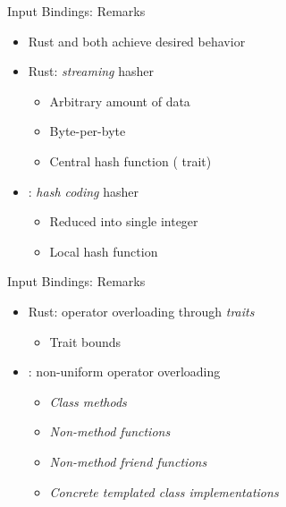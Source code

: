 \begin{frame}[t]{Input Bindings: Remarks}

    \begin{itemize}
        \itemsep.3em

        \item Rust and \cpp both achieve desired behavior

        \item Rust: \textit{streaming} hasher
            \begin{itemize}
                \item Arbitrary amount of data
                \item Byte-per-byte
                \item Central hash function ( trait)
            \end{itemize}

        \item \cpp: \textit{hash coding} hasher
            \begin{itemize}
                \item Reduced into single integer
                \item Local hash function
            \end{itemize}

    \end{itemize}

    \vfill

\end{frame}

\begin{frame}[t]{Input Bindings: Remarks}

    \begin{itemize}
        \itemsep.3em

        \item Rust: operator overloading through \textit{traits}
            \begin{itemize}
                \item Trait bounds
            \end{itemize}

        \item \cpp: non-uniform operator overloading
            \begin{itemize}
                \item \textit{Class methods}
                \item \textit{Non-method functions}
                \item \textit{Non-method friend functions}
                \item \textit{Concrete templated class implementations}
            \end{itemize}

    \end{itemize}

    \vfill

\end{frame}

